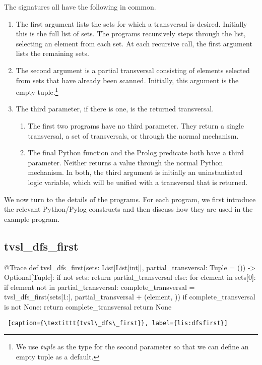 The signatures all have the following in common. 
\begin{enumerate}
\item The first argument lists the sets for which a transversal is desired. Initially this is the full list of sets. The programs recursively steps through the list, selecting an element from each set. At each recursive call, the first argument lists the remaining sets. 

\item The second argument is a partial transversal consisting of elements selected from sets that have already been scanned. Initially, this argument is the empty tuple.\footnote{We use \textit{tuple} as the type for the second parameter so that we can define an empty tuple as a default.}

\item The third parameter, if there is one, is the returned transversal.
    \begin{enumerate}
    \item The first two programs have no third parameter. They return a single transversal, a set of transversals, or  through the normal  mechanism.
    
    \item The final Python function and the Prolog predicate both have a third parameter. Neither returns a value through the normal Python  mechanism. In both, the third argument is initially an uninstantiated logic variable, which will be unified with a transversal that is returned.
    \end{enumerate}
\end{enumerate}

We now turn to the details of the programs. For each program, we first introduce the relevant Python/Pylog constructs and then discuss how they are used in the example program.

\subsection{tvsl\_dfs\_first}

\begin{minipage}{\linewidth} \largev   \hrulefill
\begin{python}[numbers=left]
@Trace
def tvsl_dfs_first(sets: List[List[int]], partial_transversal: Tuple = ()) -> Optional[Tuple]:
  if not sets:
    return partial_transversal
  else:
    for element in sets[0]:
      if element not in partial_transversal:
        complete_transversal = tvsl_dfs_first(sets[1:], partial_transversal + (element, ))
        if complete_transversal is not None:
          return complete_transversal 
    return None
\end{python}
\begin{lstlisting} [caption={\textittt{tvsl\_dfs\_first}}, label={lis:dfsfirst}]
\end{lstlisting}
\end{minipage}

